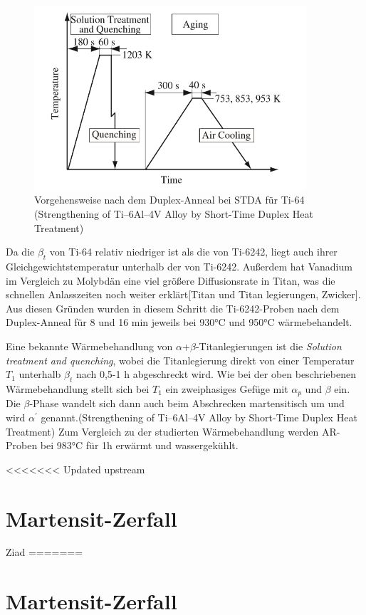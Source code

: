 \begin{figure}[H]
	\centering
	\includegraphics[width=0.9\textwidth]{Bilder/ts-stda}
	\caption{Vorgehensweise nach dem Duplex-Anneal bei STDA für Ti-64 (Strengthening of Ti–6Al–4V Alloy by Short-Time Duplex Heat Treatment)}
	\label{STDA}
\end{figure}

Da die $\beta_{t}$ von Ti-64 relativ niedriger ist als die von Ti-6242, liegt auch ihrer Gleichgewichtstemperatur unterhalb der von Ti-6242. Außerdem hat Vanadium im Vergleich zu Molybdän eine viel größere Diffusionsrate in Titan, was die schnellen Anlasszeiten noch weiter erklärt[Titan und Titan legierungen, Zwicker]. Aus diesen Gründen wurden in diesem Schritt die Ti-6242-Proben nach dem Duplex-Anneal für 8 und 16 min jeweils bei 930°C und 950°C wärmebehandelt.

Eine bekannte Wärmebehandlung von $\alpha$+$\beta$-Titanlegierungen ist die  \textit{Solution treatment and quenching}, wobei die Titanlegierung direkt von einer Temperatur $T_{1}$ unterhalb  $\beta_{t}$ nach 0,5-1 h abgeschreckt wird. Wie bei der oben beschriebenen Wärmebehandlung stellt sich bei $T_{1}$ ein zweiphasiges Gefüge mit $\alpha_p$ und $\beta$ ein. Die $\beta$-Phase wandelt sich  dann auch beim Abschrecken martensitisch um und wird $\alpha^\prime$ genannt.(Strengthening of Ti–6Al–4V Alloy by Short-Time Duplex Heat Treatment)
Zum Vergleich zu der studierten Wärmebehandlung werden AR-Proben bei 983°C für 1h erwärmt und wassergekühlt.

<<<<<<< Updated upstream
\section{Martensit-Zerfall}{Ziad}
=======
\section{Martensit-Zerfall}



